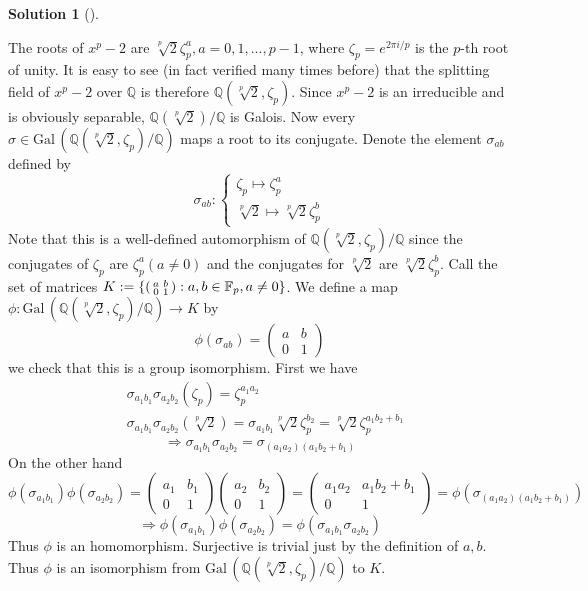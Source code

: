 \documentclass{article}
\theoremstyle{definition}
\newtheorem*{sol}{Solution}
\newenvironment{sols}[1][]{%
  \begin{sol}[#1]$ $\par\nobreak\ignorespaces
}{%
  \end{sol}
}
\newcommand{\FF}{\mathbb F}
\newcommand{\QQ}{\mathbb Q}
\newcommand{\Ra}{\Rightarrow}
\newcommand{\Gal}{\text{Gal}\,}
\begin{document}
\begin{sols}
	The roots of $x^p - 2$ are $\sqrt[p]{2} \zeta_p^a, a = 0, 1, ..., p - 1$, where $\zeta_p = e^{2 \pi i/p}$ is the $p$-th root of unity.
	It is easy to see (in fact verified many times before) that the splitting field of $x^p - 2$ over $\QQ$ is therefore $\QQ(\sqrt[p]{2}, \zeta_p)$.
	Since $x^p - 2$ is an irreducible and is obviously separable, $\QQ(\sqrt[p]{2})/\QQ$ is Galois.
	Now every $\sigma \in \Gal(\QQ(\sqrt[p]{2}, \zeta_p)/\QQ)$ maps a root to its conjugate.
	Denote the element $\sigma_{ab}$ defined by
	\[
		\sigma_{ab}:
		\begin{cases}	
			\zeta_p \mapsto \zeta_p^a\\
			\sqrt[p]{2} \mapsto \sqrt[p]{2} \zeta_p^b
		\end{cases}
	\]
	Note that this is a well-defined automorphism of $\QQ(\sqrt[p]{2}, \zeta_p)/\QQ$ since the conjugates of $\zeta_p$ are $\zeta_p^a (a \neq 0)$ and the conjugates for $\sqrt[p]{2}$ are $\sqrt[p]{2} \zeta_p^b$. 
	Call the set of matrices $K := \{\begin{psmallmatrix} a & b\\ 0 & 1 \end{psmallmatrix}: a, b \in \FF_p, a \neq 0\}$.
		We define a map $\phi: \Gal(\QQ(\sqrt[p]{2}, \zeta_p)/\QQ) \to K$ by
		\[
			\phi(\sigma_{ab}) = 
			\begin{pmatrix}
				a & b\\
				0 & 1
			\end{pmatrix}
		\]
		we check that this is a group isomorphism.
		First we have
		\[
			\begin{split}
				&\sigma_{a_1 b_1} \sigma_{a_2 b_2} (\zeta_p) = \zeta_p^{a_1 a_2}\\
				&\sigma_{a_1 b_1} \sigma_{a_2 b_2} (\sqrt[p]{2}) = \sigma_{a_1 b_1} \sqrt[p]{2} \zeta_p^{b_2} = \sqrt[p]{2} \zeta_p^{a_1 b_2 + b_1}					
			\end{split}
		\]
		\[
			\Ra \sigma_{a_1 b_1} \sigma_{a_2 b_2} = \sigma_{(a_1 a_2) (a_1 b_2 + b_1)}
		\]
		On the other hand
		\[
			\phi(\sigma_{a_1 b_1}) \phi(\sigma_{a_2 b_2}) = 
			\begin{pmatrix}
				a_1 & b_1\\
				0 & 1
			\end{pmatrix}
			\begin{pmatrix}
				a_2 & b_2\\
				0 & 1
			\end{pmatrix}
			= 
			\begin{pmatrix}
				a_1 a_2 & a_1 b_2 + b_1\\
				0 & 1
			\end{pmatrix}
			= \phi(\sigma_{(a_1 a_2) (a_1 b_2 + b_1)})
		\]
		\[
			\Ra \phi(\sigma_{a_1 b_1}) \phi(\sigma_{a_2 b_2}) = \phi(\sigma_{a_1 b_1} \sigma_{a_2 b_2})
		\]
		Thus $\phi$ is an homomorphism.
		Surjective is trivial just by the definition of $a, b$.
		Thus $\phi$ is an isomorphism from $\Gal(\QQ(\sqrt[p]{2}, \zeta_p)/\QQ)$ to $K$.
\end{sols}
\end{document}
